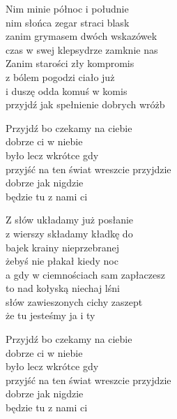 \begin{text}
    Nim minie północ i południe\\
    nim słońca zegar straci blask\\
    zanim grymasem dwóch wskazówek\\
    czas w swej klepsydrze zamknie nas\\
    Zanim starości zły kompromis\\
    z bólem pogodzi ciało już\\
    i duszę odda komuś w komis\\
    przyjdź jak spełnienie dobrych wróżb

    Przyjdź bo czekamy na ciebie\\
    dobrze ci w niebie\\
    było lecz wkrótce gdy\\
    przyjść na ten świat wreszcie przyjdzie\\
    dobrze jak nigdzie\\
    będzie tu z nami ci

    Z słów układamy już posłanie\\
    z wierszy składamy kładkę do\\
    bajek krainy nieprzebranej\\
    żebyś nie płakał kiedy noc\\
    a gdy w ciemnościach sam zapłaczesz\\
    to nad kołyską niechaj lśni\\
    słów zawieszonych cichy zaszept\\
    że tu jesteśmy ja i ty

    Przyjdź bo czekamy na ciebie\\
    dobrze ci w niebie\\
    było lecz wkrótce gdy\\
    przyjść na ten świat wreszcie przyjdzie\\
    dobrze jak nigdzie\\
    będzie tu z nami ci
\end{text}
\begin{chord}

\end{chord}